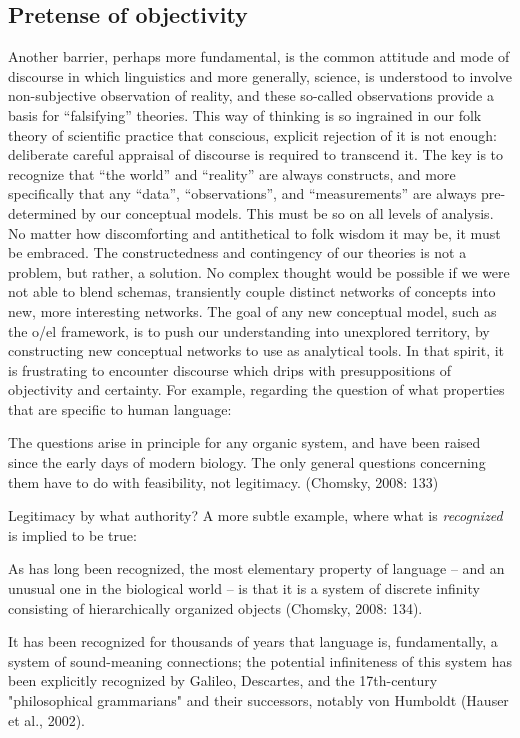 \subsection{Pretense of objectivity}

Another barrier, perhaps more fundamental, is the common attitude and mode of discourse in which linguistics and more generally, science, is understood to involve non-subjective observation of reality, and these so-called observations provide a basis for “falsifying” theories. This way of thinking is so ingrained in our folk theory of scientific practice that conscious, explicit rejection of it is not enough: deliberate careful appraisal of discourse is required to transcend it. The key is to recognize that “the world” and “reality” are always constructs, and more specifically that any “data”, “observations”, and “measurements” are always pre-determined by our conceptual models. This must be so on all levels of analysis. No matter how discomforting and antithetical to folk wisdom it may be, it must be embraced. The constructedness and contingency of our theories is not a problem, but rather, a solution. No complex thought would be possible if we were not able to blend schemas, transiently couple distinct networks of concepts into new, more interesting networks. The goal of any new conceptual model, such as the o/el framework, is to push our understanding into unexplored territory, by constructing new conceptual networks to use as analytical tools. In that spirit, it is frustrating to encounter discourse which drips with presuppositions of objectivity and certainty. For example, regarding the question of what properties that are specific to human language:

The questions arise in principle for any organic system, and have been raised since the early days of modern biology. The only general questions concerning them have to do with feasibility, not legitimacy. (Chomsky, 2008: 133)

Legitimacy by what authority? A more subtle example, where what is \textit{recognized} is implied to be true:

As has long been recognized, the most elementary property of language – and an unusual one in the biological world – is that it is a system of discrete infinity consisting of hierarchically organized objects (Chomsky, 2008: 134).

It has been recognized for thousands of years that language is, fundamentally, a system of sound-meaning connections; the potential infiniteness of this system has been explicitly recognized by Galileo, Descartes, and the 17th-century "philosophical grammarians" and their successors, notably von Humboldt (Hauser et al., 2002).


